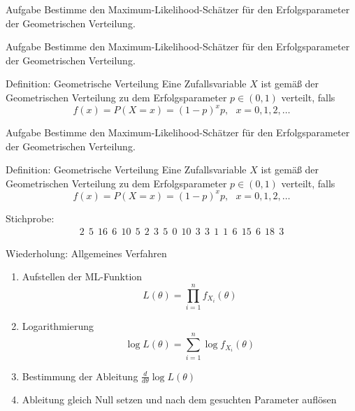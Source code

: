 \documentclass[t,11pt]{beamer}
\begin{document}
	\author{www.oilbat.de}
	\subtitle{}
	\logo{}
	\institute{}
	\date{}
	\subject{}

\addtocounter{framenumber}{-1}

\begin{frame}
	\begin{block}{Aufgabe}
		Bestimme den Maximum-Likelihood-Schätzer für den Erfolgsparameter der Geometrischen Verteilung.
	\end{block}
\end{frame}

\begin{frame}
\begin{block}{Aufgabe}
	Bestimme den Maximum-Likelihood-Schätzer für den Erfolgsparameter der Geometrischen Verteilung.
\end{block}
\begin{alertblock}{Definition: Geometrische Verteilung}
	Eine Zufallsvariable $X$ ist gemäß der Geometrischen Verteilung zu dem Erfolgsparameter $p\in (0,1)$ verteilt, falls
	\begin{equation*}
	f(x)=P(X=x)=(1-p)^xp, \ \ \ x=0,1,2,\dots
	\end{equation*}
\end{alertblock}
\end{frame}

\begin{frame}
\begin{block}{Aufgabe}
	Bestimme den Maximum-Likelihood-Schätzer für den Erfolgsparameter der Geometrischen Verteilung.
\end{block}
\begin{alertblock}{Definition: Geometrische Verteilung}
	Eine Zufallsvariable $X$ ist gemäß der Geometrischen Verteilung zu dem Erfolgsparameter $p\in (0,1)$ verteilt, falls
	\begin{equation*}
	f(x)=P(X=x)=(1-p)^xp, \ \ \ x=0,1,2,\dots
	\end{equation*}
\end{alertblock}
\vfill
Stichprobe:
\begin{align*}
	2 ~~ 5 ~~ 16 ~~ 6 ~~ 10 ~~ 5 ~~ 2 ~~ 3 ~~ 5 ~~ 0 ~~ 10 ~~ 3 ~~ 3 ~~ 1 ~~ 1 ~~ 6 ~~ 15 ~~ 6 ~~ 18 ~~ 3
\end{align*}
\end{frame}

\begin{frame}
	\begin{exampleblock}{Wiederholung: Allgemeines Verfahren}
		\begin{enumerate}
			\item Aufstellen der ML-Funktion $$L(\theta)=\prod_{i=1}^{n}f_{X_i}(\theta)$$
			\item Logarithmierung $$\log L(\theta)=\sum_{i=1}^{n}\log f_{X_i}(\theta)$$
			\item Bestimmung der Ableitung $\frac{d}{d\theta}\log L(\theta)$
			\item Ableitung gleich Null setzen und nach dem gesuchten Parameter auflösen
		\end{enumerate}
	\end{exampleblock}
\end{frame}
\end{document}
